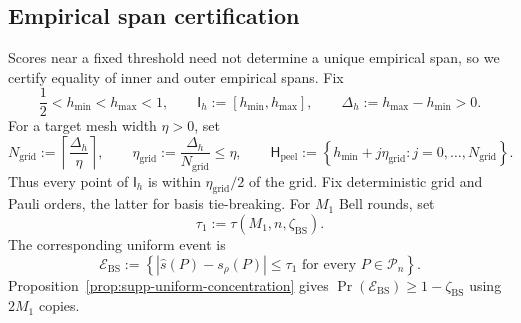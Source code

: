 \documentclass[
  aps,
  prx,
  reprint,
  superscriptaddress,
  amsmath,
  amssymb,
  nofootinbib,
  longbibliography
]{revtex4-2}
\newcommand{\Pc}{\mathcal{P}}
\begin{document}
\subsection{Empirical span certification}
\label{sec:supp-empirical-span-certification}

Scores near a fixed threshold need not determine a unique empirical span, so
we certify equality of inner and outer empirical spans.  Fix
\begin{equation}
\frac12<h_{\min}<h_{\max}<1,
\qquad
\mathsf I_h:=[h_{\min},h_{\max}],
\qquad
\Delta_h:=h_{\max}-h_{\min}>0.
\label{eq:supp-peeling-threshold-window}
\end{equation}
For a target mesh width $\eta>0$, set
\begin{equation}
N_{\mathrm{grid}}:=\left\lceil\frac{\Delta_h}{\eta}\right\rceil,
\qquad
\eta_{\mathrm{grid}}:=\frac{\Delta_h}{N_{\mathrm{grid}}}\le\eta,
\qquad
\mathsf H_{\mathrm{peel}}
:=
\left\{
h_{\min}+j\eta_{\mathrm{grid}}
:
j=0,\ldots,N_{\mathrm{grid}}
\right\}.
\label{eq:supp-peeling-threshold-grid}
\end{equation}
Thus every point of $\mathsf I_h$ is within
$\eta_{\mathrm{grid}}/2$ of the grid.  Fix deterministic grid and Pauli
orders, the latter for basis tie-breaking.  For $M_1$ Bell rounds, set
\begin{equation}
\tau_1
:=
\tau(M_1,n,\zeta_{\mathrm{BS}}).
\label{eq:supp-peeling-score-radius}
\end{equation}
The corresponding uniform event is
\begin{equation}
\mathcal E_{\mathrm{BS}}
:=
\left\{
|\hat s(P)-s_\rho(P)|\le\tau_1
\text{ for every }P\in\Pc_n
\right\}.
\label{eq:supp-peeling-uniform-event}
\end{equation}
Proposition~\ref{prop:supp-uniform-concentration} gives
$\Pr(\mathcal E_{\mathrm{BS}})\ge1-\zeta_{\mathrm{BS}}$ using $2M_1$
copies.
\end{document}
